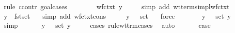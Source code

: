 \begin{isabellebody}
%
\isatagproof
{}\isamarkupfalse%
\ {\isacharparenleft}rule\ ccontr{\isacharcomma}\ goal{\isacharunderscore}cases{\isacharparenright}\isanewline
{}\isamarkupfalse%
\ {}\ \isanewline
\ \ \isamarkupfalse%
\ \isamarkupfalse%
\ {\isachardoublequoteopen}wf{\isacharunderscore}ctxt\ {\isacharparenleft}{\isacharparenleft}y{\isacharcomma}\ {\isasymtau}{\isacharparenright}\ {\isacharhash}\ {\isasymGamma}{\isacharparenright}{\isachardoublequoteclose}\ \isamarkupfalse%
\ {\isacharparenleft}simp\ add{\isacharcolon}\ wt{\isacharunderscore}terms{\isacharunderscore}impl{\isacharunderscore}wf{\isacharunderscore}ctxt{\isacharparenright}\isanewline
\ \ \isamarkupfalse%
\ \isamarkupfalse%
\ {\isachardoublequoteopen}y\ {\isasymnotin}\ fst{\isacharbackquote}set\ {\isasymGamma}{\isachardoublequoteclose}\ \isamarkupfalse%
\ {\isacharparenleft}simp\ add{\isacharcolon}\ wf{\isacharunderscore}ctxt{\isacharunderscore}cons{\isacharparenright}\isanewline
\ \ \isamarkupfalse%
\ \isamarkupfalse%
\ {\isachardoublequoteopen}{\isacharparenleft}y{\isacharcomma}\ {\isasymsigma}{\isacharparenright}\ {\isasymnotin}\ set\ {\isasymGamma}{\isachardoublequoteclose}\ \isamarkupfalse%
\ force\isanewline
\ \ \isamarkupfalse%
\ {}{\isacharparenleft}{}{\isacharparenright}\ \isamarkupfalse%
\ {}{\isacharcolon}\ {\isachardoublequoteopen}{\isacharparenleft}y{\isacharcomma}\ {\isasymsigma}{\isacharparenright}\ {\isasymnotin}\ set\ {\isacharparenleft}{\isacharparenleft}y{\isacharcomma}\ {\isasymtau}{\isacharparenright}\ {\isacharhash}\ {\isasymGamma}{\isacharparenright}{\isachardoublequoteclose}\ \isamarkupfalse%
\ simp\isanewline
\ \ \isamarkupfalse%
\ {}{\isacharparenleft}{}{\isacharparenright}\ \isamarkupfalse%
\ {\isachardoublequoteopen}{\isacharparenleft}y{\isacharcomma}\ {\isasymsigma}{\isacharparenright}\ {\isasymin}\ set\ {\isacharparenleft}{\isacharparenleft}y{\isacharcomma}\ {\isasymtau}{\isacharparenright}\ {\isacharhash}\ {\isasymGamma}{\isacharparenright}{\isachardoublequoteclose}\ \isamarkupfalse%
\ {\isacharparenleft}cases\ rule{\isacharcolon}wt{\isacharunderscore}trm{\isachardot}cases{\isacharparenright}\ \isamarkupfalse%
\ auto\isanewline
\ \ \isamarkupfalse%
\ {}\ \isamarkupfalse%
\ {\isacharquery}case\ \isamarkupfalse%

\end{isabellebody}
